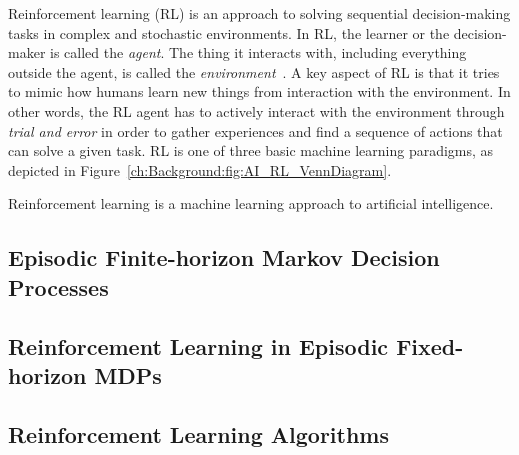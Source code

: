 Reinforcement learning (RL) is an approach to solving sequential decision-making tasks in complex and stochastic environments.
In RL,
the learner or the decision-maker is called the \textit{agent}.
The thing it interacts with,
including everything outside the agent,
is called the \textit{environment}~\cite{RL_Sutton2018}.
A key aspect of RL is that it tries to mimic how humans learn new things from interaction with the environment.
In other words,
the RL agent has to actively interact with the environment through \textit{trial and error} in order to gather experiences and find a sequence of actions that can solve a given task.
RL is one of three basic machine learning paradigms,
as depicted in Figure~\ref{ch:Background:fig:AI_RL_VennDiagram}.

%
{Reinforcement learning is a machine learning approach to artificial intelligence.\label{ch:Background:fig:AI_RL_VennDiagram}}


\subsection{Episodic Finite-horizon Markov Decision Processes}


\subsection {Reinforcement Learning in Episodic Fixed-horizon MDPs}


\subsection{Reinforcement Learning Algorithms}

